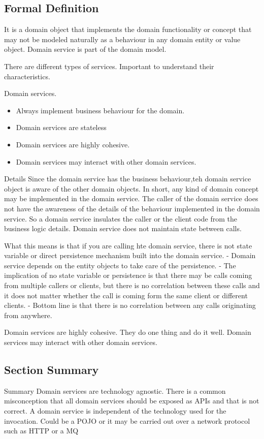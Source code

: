 \documentclass[a4paper, 11pt]{book}
\begin{document}
    \subsection{Formal Definition}
    It is a domain object that implements the domain functionality or concept that may not be modeled naturally as a behaviour in any domain entity or value object.
    Domain service is part of the domain model.

    There are different types of services.
    Important to understand their characteristics.

    Domain services.
    \begin{itemize}
    \item Always implement business behaviour for the domain.
    \item Domain services are stateless
    \item Domain services are highly cohesive.
    \item Domain services may interact with other domain services.
    \end{itemize}

    Details
    Since the domain service has the business behaviour,teh domain service object is aware of the other domain objects.
    In short, any kind of domain concept may be implemented in the domain service.
    The caller of the domain service does not have the awareness of the details of the behaviour implemented in the domain service.
    So a domain service insulates the caller or the client code from the business logic details.
    Domain service does not maintain state between calls.

    What this means is that if you are calling hte domain service, there is not state variable or direct persistence mechanism built into the domain service.
    - Domain service depends on the entity objects to take care of the persistence.
    - The implication of no state variable or persistence is that there may be calls coming from multiple callers or clients,
    but there is no correlation between these calls and it does not matter whether the call is coming form the same client or different clients.
    - Bottom line is that there is no correlation between any calls originating from anywhere.

    Domain services are highly cohesive.
    They do one thing and do it well.
    Domain services may interact with other domain services.

    \subsection{Section Summary}
    Summary
    Domain services are technology agnostic.
    There is a common misconception that all domain services should be exposed as APIs and that is not correct.
    A domain service is independent of the technology used for the invocation.
    Could be a POJO or it may be carried out over a network protocol such as HTTP or a MQ
\end{document}

